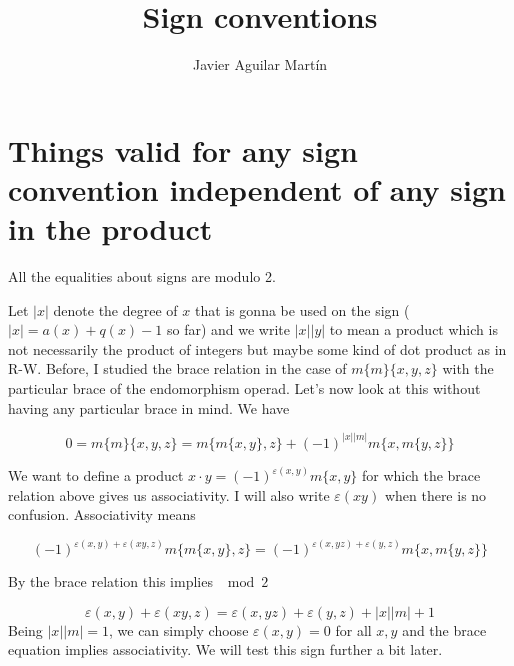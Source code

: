 \documentclass[twoside]{article}
\begin{document}
\title{Sign conventions}
\author{Javier Aguilar Martín}
\maketitle

\section{Things valid for any sign convention independent of any sign in the product}


All the equalities about signs are modulo 2.

Let $|x|$ denote the degree of $x$ that is gonna be used on the sign ($|x|=a(x)+q(x)-1$ so far) and we write $|x||y|$ to mean a product which is not necessarily the product of integers but maybe some kind of dot product as in R-W. Before, I studied the brace relation in the case of $m\{m\}\{x,y,z\}$ with the particular brace of the endomorphism operad. Let's now look at this without having any particular brace in mind. We have

$$0=m\{m\}\{x,y,z\}=m\{m\{x,y\},z\}+(-1)^{|x||m|}m\{x,m\{y,z\}\}$$

We want to define a product $x\cdot y=(-1)^{\varepsilon(x,y)}m\{x,y\}$ for which the brace relation above gives us associativity. I will also write $\varepsilon(xy)$ when there is no confusion. Associativity means

$$(-1)^{\varepsilon(x,y)+\varepsilon(xy,z)}m\{m\{x,y\},z\}=(-1)^{\varepsilon(x,yz)+\varepsilon(y,z)}m\{x,m\{y,z\}\}$$

By the brace relation this implies $\mod 2$ 

\begin{equation}\label{ass-sing}%
\varepsilon(x,y)+\varepsilon(xy,z)=\varepsilon(x,yz)+\varepsilon(y,z)+|x||m|+1
\end{equation}
%
%
Being $|x||m|=1$, we can simply choose $\varepsilon(x,y)=0$ for all $x,y$ and the brace equation implies associativity. We will test this sign further a bit later. 
\end{document}
